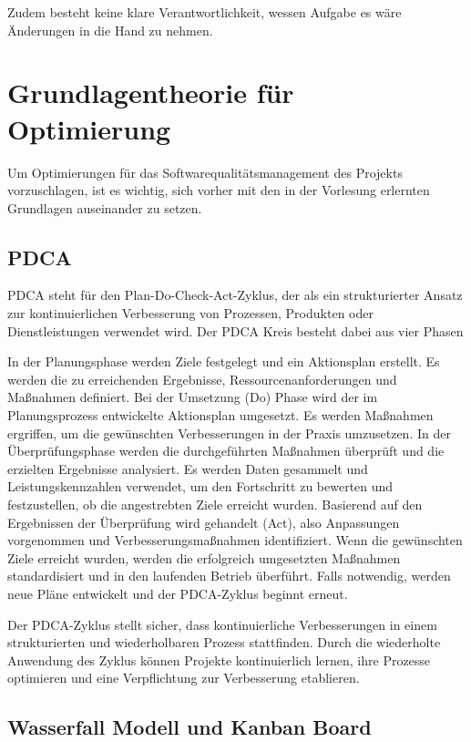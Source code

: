  Zudem besteht keine klare Verantwortlichkeit, wessen Aufgabe es wäre Änderungen in die Hand zu nehmen. %

\section{Grundlagentheorie für Optimierung}

Um Optimierungen für das Softwarequalitätsmanagement des Projekts vorzuschlagen, ist es wichtig, sich vorher mit den in der Vorlesung erlernten Grundlagen auseinander zu setzen.

\subsection{PDCA}

PDCA steht für den Plan-Do-Check-Act-Zyklus, der als ein strukturierter Ansatz zur kontinuierlichen Verbesserung von Prozessen, Produkten oder Dienstleistungen verwendet wird. Der PDCA Kreis besteht dabei aus vier Phasen

In der Planungsphase werden Ziele festgelegt und ein Aktionsplan erstellt. Es werden die zu erreichenden Ergebnisse, Ressourcenanforderungen und Maßnahmen definiert. 
Bei der Umsetzung (Do) Phase wird der im Planungsprozess entwickelte Aktionsplan umgesetzt. Es werden Maßnahmen ergriffen, um die gewünschten Verbesserungen in der Praxis umzusetzen. 
 In der Überprüfungsphase werden die durchgeführten Maßnahmen überprüft und die erzielten Ergebnisse analysiert. Es werden Daten gesammelt und Leistungskennzahlen verwendet, um den Fortschritt zu bewerten und festzustellen, ob die angestrebten Ziele erreicht wurden.
Basierend auf den Ergebnissen der Überprüfung wird gehandelt (Act), also Anpassungen vorgenommen und Verbesserungsmaßnahmen identifiziert. Wenn die gewünschten Ziele erreicht wurden, werden die erfolgreich umgesetzten Maßnahmen standardisiert und in den laufenden Betrieb überführt. Falls notwendig, werden neue Pläne entwickelt und der PDCA-Zyklus beginnt erneut.

Der PDCA-Zyklus stellt sicher, dass kontinuierliche Verbesserungen in einem strukturierten und wiederholbaren Prozess stattfinden. Durch die wiederholte Anwendung des Zyklus können Projekte kontinuierlich lernen, ihre Prozesse optimieren und eine  Verpflichtung zur Verbesserung etablieren.

\subsection{Wasserfall Modell und Kanban Board}

